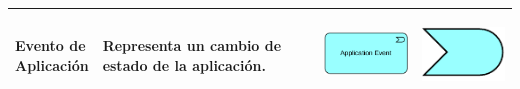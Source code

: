 \begin{longtable}{|p{0.15\linewidth}|p{0.45\linewidth}|p{0.2\linewidth} p{0.2\linewidth}|}
    Evento de Aplicación 
    &
    Representa un cambio de estado de la aplicación. 
    &
\begin{center}
    \includegraphics[width=1\linewidth]{imgs/capa_aplicacion/Aplication_event.pdf}
\end{center} &
\begin{center}
    \includegraphics[width=0.7\linewidth]{imgs/capa_aplicacion/event.pdf}
\end{center}
    \\ \hline



\end{longtable}
